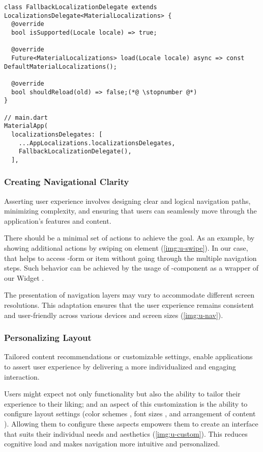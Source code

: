 \begin{lstlisting}
class FallbackLocalizationDelegate extends LocalizationsDelegate<MaterialLocalizations> {
  @override
  bool isSupported(Locale locale) => true;
  
  @override
  Future<MaterialLocalizations> load(Locale locale) async => const DefaultMaterialLocalizations();

  @override
  bool shouldReload(old) => false;(*@ \stopnumber @*)
}

// main.dart
MaterialApp(
  localizationsDelegates: [
    ...AppLocalizations.localizationsDelegates,
    FallbackLocalizationDelegate(),
  ],
\end{lstlisting}


\subsubsection{Creating Navigational Clarity} 

Asserting user experience involves designing clear and logical navigation paths, minimizing complexity, and ensuring 
that users can seamlessly move through the application's features and content.

There should be a minimal set of actions to achieve the goal. As an example, by showing additional actions by swiping 
on element (\cref{img:u-swipe}). In our case, that helps to access -form or  item without going 
through the multiple navigation steps. Such behavior can be achieved by the usage of 
-component as a wrapper of our Widget .

The presentation of navigation layers may vary to accommodate different screen resolutions. This adaptation 
ensures that the user experience remains consistent and user-friendly across various devices and screen sizes 
(\cref{img:u-nav}).




\subsubsection{Personalizing Layout}

Tailored content recommendations or customizable settings, enable applications to assert user experience by delivering 
a more individualized and engaging interaction.

Users might expect not only functionality but also the ability to tailor their experience to their liking; and an 
aspect of this customization is the ability to configure layout settings (color schemes , font sizes 
, and arrangement of content ). Allowing them to configure these aspects empowers them to 
create an interface that suits their individual needs and aesthetics (\cref{img:u-custom}). This reduces cognitive 
load and makes navigation more intuitive and personalized.

